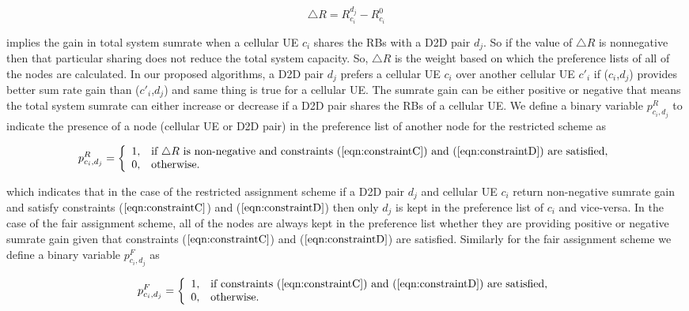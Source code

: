 \documentclass[times]{dacauth}
\begin{document}
\begin{equation}
	\triangle R = R_{c_i}^{d_j}-R_{c_i}^{0} \label{eqn:sum rate increment}
\end{equation}  
       
    

\noindent
implies the gain in total system sumrate when a cellular UE $c_i$ shares the RBs with a D2D pair $d_j$. So if the value of $\triangle R$ is nonnegative then that particular sharing does not reduce the total system capacity. So, $\triangle R$ is the weight based on which the preference lists of all of the nodes are calculated. In our proposed algorithms, a D2D pair $d_j$ prefers a cellular UE $c_i$ over another cellular UE $c'_i$ if ($c_i$,$d_j$) provides better sum rate gain than ($c'_i$,$d_j$) and same thing is true for a cellular UE. The sumrate gain can be either positive or negative that means the total system sumrate can either increase or decrease if a D2D pair shares the RBs of a cellular UE. We define a binary variable $p_{c_i,d_j}^{R}$ to indicate the presence of a node (cellular UE or D2D pair) in the preference list of another node for the restricted scheme as

\[ p_{c_i,d_j}^{R} = \left\{ \begin{array}{ll}
         1, & \mbox{if $\triangle R$ is non-negative and constraints ($\ref{eqn:constraintC}$) and ($\ref{eqn:constraintD}$) are satisfied,}\\
         0, & \mbox{otherwise}.\end{array} \right. \]

\noindent         
which indicates that in the case of the restricted assignment scheme if a D2D pair $d_j$ and cellular UE $c_i$ return non-negative sumrate gain and satisfy constraints ($\ref{eqn:constraintC}$) and ($\ref{eqn:constraintD}$) then only  $d_j$ is kept in the preference list of $c_i$ and vice-versa.        
\noindent
In the case of the fair assignment scheme, all of the nodes are always kept in the preference list whether they are providing positive or negative sumrate gain given that constraints ($\ref{eqn:constraintC}$) and ($\ref{eqn:constraintD}$) are satisfied. Similarly for the fair assignment scheme we define a binary variable $p_{c_i,d_j}^{F}$ as  

\[ p_{c_i,d_j}^{F} = \left\{ \begin{array}{ll}
         1, & \mbox{if constraints  ($\ref{eqn:constraintC}$) and ($\ref{eqn:constraintD}$) are satisfied,}\\
         0, & \mbox{otherwise}.\end{array} \right. \]  
 
\end{document}
